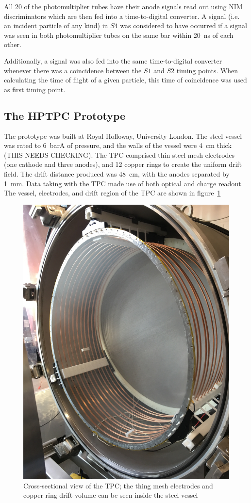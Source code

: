     All 20 of the photomultiplier tubes have their anode signals read out using NIM discriminators which are then fed into a time-to-digital converter. 
    A signal (i.e. an incident particle of any kind) in $S4$ was considered to have occurred if a signal was seen in both photomultiplier tubes on the same bar within 20~ns of each other.
    
    Additionally, a signal was also fed into the same time-to-digital converter whenever there was a coincidence between the $S1$ and $S2$ timing points. 
    When calculating the time of flight of a given particle, this time of coincidence was used as first timing point.
    
    \subsection{The HPTPC Prototype}
    The prototype was built at Royal Holloway, University London.
    The steel vessel was rated to 6~barA of pressure, and the walls of the vessel were 4~cm thick (THIS NEEDS CHECKING).
    The TPC comprised thin steel mesh electrodes (one cathode and three anodes), and 12 copper rings to create the uniform drift field.
    The drift distance produced was 48~cm, with the anodes separated by 1~mm.
    Data taking with the TPC made use of both optical and charge readout.
    The vessel, electrodes, and drift region of the TPC are shown in figure~\ref{fig:TPC}
    
     \begin{figure}
      \centering
    \includegraphics[width=0.6\linewidth]{files/Figures/IMG_1194.jpg}
    	\caption{Cross-sectional view of the TPC; the thing mesh electrodes and copper ring drift volume can be seen inside the steel vessel}
    		\label{fig:TPC}
    \end{figure}
    
